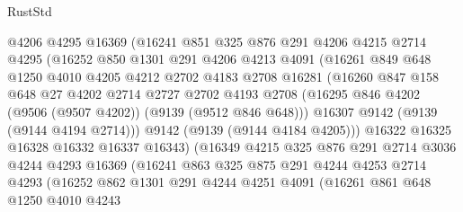 \begin{lexlean}{RustStd}
\begin{coremodule}
                  @4206
                  @4295
                  @16369
                  (@16241
                    @851
                    @325
                    @876
                    @291
                    @4206
                    @4215
                    @2714
                    @4295
                    (@16252
                      @850
                      @1301
                      @291
                      @4206
                      @4213
                      @4091
                      (@16261
                        @849
                        @648
                        @1250
                        @4010
                        @4205
                        @4212
                        @2702
                        @4183
                        @2708
                        @16281
                        (@16260
                          @847
                          @158
                          @648
                          @27
                          @4202
                          @2714
                          @2727
                          @2702
                          @4193
                          @2708
                          (@16295 @846 @4202 (@9506 (@9507 @4202)) (@9139 (@9512 @846 @648)))
                          @16307
                          @9142
                          (@9139 (@9144 @4194 @2714)))
                        @9142
                        (@9139 (@9144 @4184 @4205)))
                      @16322
                      @16325
                      @16328
                      @16332
                      @16337
                      @16343)
                    (@16349
                      @4215
                      @325
                      @876
                      @291
                      @2714
                      @3036
                      @4244
                      @4293
                      @16369
                      (@16241
                        @863
                        @325
                        @875
                        @291
                        @4244
                        @4253
                        @2714
                        @4293
                        (@16252
                          @862
                          @1301
                          @291
                          @4244
                          @4251
                          @4091
                          (@16261
                            @861
                            @648
                            @1250
                            @4010
                            @4243

\end{coremodule}
\end{lexlean}
